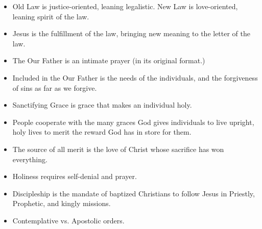 \documentclass[11pt]{article}
\begin{document}
\begin{itemize}
	\item Old Law is justice-oriented, leaning legalistic.  New Law is love-oriented,
		leaning spirit of the law.
	\item Jesus is the fulfillment of the law, bringing new meaning to the letter
		of the law.
	\item The Our Father is an intimate prayer (in its original format.)
	\item Included in the Our Father is the needs of the individuals, and
		the forgiveness of sins as far as we forgive.
	\item Sanctifying Grace is grace that makes an individual holy.
	\item People cooperate with the many graces God gives individuals
		to live upright, holy lives to merit the reward God has in store
		for them.
	\item The source of all merit is the love of Christ whose sacrifice has
		won everything.
	\item Holiness requires self-denial and prayer.
	\item Discipleship is the mandate of baptized Christians to follow
		Jesus in Priestly, Prophetic, and kingly missions.
	\item Contemplative vs. Apostolic orders.
\end{itemize}
\end{document}
